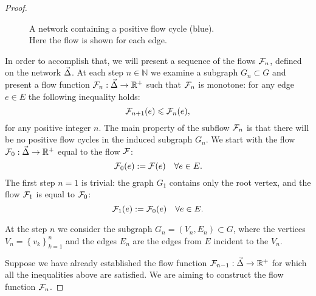 \documentclass[12pt]{article}
\begin{document}
\begin{proof}
\begin{figure}
\begin{center}
        \caption{A network containing a positive flow cycle (blue).\\ Here the flow is shown for each edge.} 
        \label{positive-flow}
        \end{center}
      \end{figure}
      In order to accomplish that, we will present a sequence of the flows $\mathcal{F}_{n}$, defined on the network $\vec{\Delta}$.
      At each step $n \in \mathbb{N}$ we examine a subgraph $G_n \subset G$ and present a flow function $\mathcal{F}_{n}: \vec{\Delta} \to \mathbb{R}^{+}$
        such that $\mathcal{F}_{n}$ is monotone: for any edge $e \in E$ the following inequality holds:
      \[
        \mathcal{F}_{n+1}(e) \leqslant \mathcal{F}_{n}(e),
      \]
      for any positive integer $n$.
      The main property of the subflow $\mathcal{F}_{n}$ is that there will be no positive flow cycles in the induced subgraph
      $G_n$.
      We start with the flow $\mathcal{F}_{0}:\vec{\Delta} \to \mathbb{R}^+$ equal to the flow $\mathcal{F}$:
      \[
        \mathcal{F}_{0}(e) := \mathcal{F}(e) \quad \forall e \in E.
      \]
      The first step $n = 1$ is trivial: the graph $G_1$ contains only the root vertex, and
        the flow $\mathcal{F}_{1}$ is equal to $\mathcal{F}_{0}$:
      \[
        \mathcal{F}_{1}(e) := \mathcal{F}_{0}(e) \quad \forall e \in E.
      \]

      At the step $n$ we consider the subgraph $G_n = (V_n, E_n) \subset G$, where the vertices
        $V_n = \left\{v_k\right\}_{k=1}^n$ and the edges $E_n$ are the edges from $E$ incident to the $V_n$.

      Suppose we have already established the flow function $\mathcal{F}_{n-1}: \vec{\Delta} \to \mathbb{R}^{+}$ for which
        all the inequalities above are satisfied.
      We are aiming to construct the flow function $\mathcal{F}_{n}$.


\end{proof}
\end{document}
